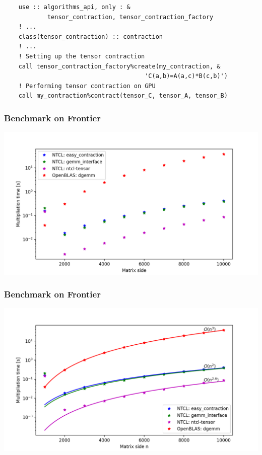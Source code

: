 \begin{frame}[fragile]

\begin{lstlisting}
    use :: algorithms_api, only : &
            tensor_contraction, tensor_contraction_factory
    ! ...
    class(tensor_contraction) :: contraction
    ! ...
    ! Setting up the tensor contraction
    call tensor_contraction_factory%create(my_contraction, &
                                       'C(a,b)=A(a,c)*B(c,b)')
    ! Performing tensor contraction on GPU
    call my_contraction%contract(tensor_C, tensor_A, tensor_B)
\end{lstlisting}
\end{frame}

\begin{frame}
\frametitle{Benchmark on Frontier}
\begin{center}
\includegraphics[scale=0.6]{figures/NTCL-vs-OpenBLAS-Frontier-matrix-multiplication.png}
\end{center}
\end{frame}

\begin{frame}
\frametitle{Benchmark on Frontier}
\begin{center}
\includegraphics[scale=0.6]{figures/NTCL-vs-OpenBLAS-Frontier-matrix-multiplication-polyfits.png}
\end{center}
\end{frame}

